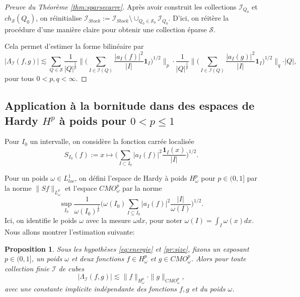 \documentclass[11pt]{amsart}
\newtheorem{proposition}[theorem]{Proposition}
\newcommand{\one}{\mathbf{1}}
\newcommand{\ii}{\mathscr}
\newcommand{\ic}{\mathcal}
\begin{document}
\begin{proof}[Preuve du Th\'eor\`eme \ref{thm:sparsecarre}]
Apr\`es avoir construit les collections $\ii I_{Q_0}$ et $ch_{\ic S}(Q_0)$, on r\'einitialise $\ii I_{Stock}:=\ii I_{Stock} \setminus \cup_{Q_0 \in \ic S_0} \ii I_{Q_0}$. D'ici, on r\'eit\`ere la proc\'edure d'une mani\`ere claire pour obtenir une collection \'eparse $\ic S$.

Cela permet d'estimer la forme bilin\'eaire par 
\begin{equation}
\label{eq:sparce-sf}
\vert \Lambda_{\ii I} (f, g) \vert \lesssim \sum_{Q \in \ic S} \frac{1}{\vert Q \vert^{\frac{1}{p}}} \big\|  \Big( \sum_{ I \in \ii I(Q)}  \frac{\vert a_I(f) \vert^2}{\vert I \vert}  \one_I \Big)^{1/2}   \big\|_p \cdot \frac{1}{\vert Q \vert^{\frac{1}{p}}} \big\|  \Big( \sum_{ I \in \ii I(Q)} \frac{\vert a_I(g) \vert^2}{\vert I \vert}  \one_I \Big)^{1/2}   \big\|_q \cdot \vert Q  \vert,
\end{equation}
pour tous $0<p, q<\infty$.
\end{proof}



\subsection{Application \`a la bornitude dans des espaces de Hardy $H^p$ \`a poids pour $0<p\leq 1$}
\label{subsec:p<1}


Pour $I_0$ un intervalle, on consid\`ere la fonction carr\'ee localis\'ee
$$ S_{I_0}(f) := x \mapsto \big( \sum_{I \subset I_0} |a_I(f)|^2 \frac{\one_I(x)}{|I|}\big)^{1/2}.$$

Pour un poids $\omega\in L^1_{loc}$, on d\'efini l'espace de Hardy \`a poids $H^p_\omega$ pour $p\in(0,1]$ par la norme $\|Sf \|_{L^p_\omega}$ et l'espace $CMO_\omega^p$ par la norme
$$ \sup_{I_0} \frac{1}{\omega(I_0)^\frac{1}{p}} \Big(\omega(I_0) \sum_{I \subseteq I_0} \vert a_I(f)\vert^2 \frac{\vert I \vert}{\omega(I)} \Big)^{1/2}.$$
Ici, on identifie le poids $\omega$ avec la mesure $\omega dx$, pour noter $\omega(I)=\int_I \omega(x) dx$. Nous allons montrer l'estimation suivante:

\begin{proposition} \label{prop:Hardy} Sous les hypoth\`eses \eqref{eq:energie} et \eqref{pr:size}, fixons un exposant $p\in(0,1]$, un poids $\omega$ et deux fonctions $f\in H^p_\omega$ et $g\in CMO_\omega^p$. Alors pour toute collection finie $\ii I$ de cubes
$$ \vert \Lambda_{\ii I}(f, g) \vert \lesssim \| f \|_{H^p_\omega} \cdot \| g \|_{CMO_\omega^p},$$
avec une constante implicite ind\'ependante des fonctions $f,g$ et du poids $\omega$.
\end{proposition}
\end{document}
